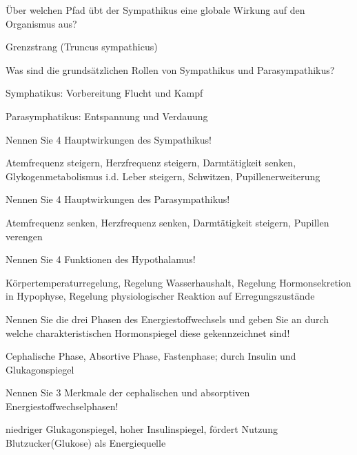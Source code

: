 \documentclass[10pt, a4paper]{exam}
\begin{document}
\begin{questions}
  \question Über welchen Pfad übt der Sympathikus eine globale Wirkung auf den Organismus aus?
  \begin{solution}
    Grenzstrang (Truncus sympathicus)
  \end{solution}

  \question Was sind die grundsätzlichen Rollen von Sympathikus und Parasympathikus?
  \begin{solution}
    \begin{itemize*}
      \item Symphatikus: Vorbereitung Flucht und Kampf
      \item Parasymphatikus: Entspannung und Verdauung
    \end{itemize*}
  \end{solution}

  \question Nennen Sie 4 Hauptwirkungen des Sympathikus!
  \begin{solution}
    Atemfrequenz steigern, Herzfrequenz steigern, Darmtätigkeit senken, Glykogenmetabolismus i.d. Leber steigern, Schwitzen, Pupillenerweiterung
  \end{solution}

  \question Nennen Sie 4 Hauptwirkungen des Parasympathikus!
  \begin{solution}
    Atemfrequenz senken, Herzfrequenz senken, Darmtätigkeit steigern, Pupillen verengen
  \end{solution}

  \question Nennen Sie 4 Funktionen des Hypothalamus!
  \begin{solution}
    Körpertemperaturregelung, Regelung Wasserhaushalt, Regelung Hormonsekretion in Hypophyse, Regelung physiologischer Reaktion auf Erregungszustände
  \end{solution}

  \question Nennen Sie die drei Phasen des Energiestoffwechsels und geben Sie an durch welche charakteristischen Hormonspiegel diese gekennzeichnet sind!
  \begin{solution}
    Cephalische Phase, Absortive Phase, Fastenphase; durch Insulin und Glukagonspiegel
  \end{solution}

  \question Nennen Sie 3 Merkmale der cephalischen und absorptiven Energiestoffwechselphasen!
  \begin{solution}
    niedriger Glukagonspiegel, hoher Insulinspiegel, fördert Nutzung Blutzucker(Glukose) als Energiequelle
  \end{solution}


\end{questions}
\end{document}
